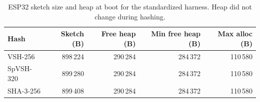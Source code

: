 \begin{table}[ht]
\caption{ESP32 sketch size and heap at boot for the standardized harness. Heap did not change during hashing.}
\label{tab:esp32-romram}
\centering
\begin{tabular}{@{}lrrrr@{}}
\toprule
Hash & Sketch (B) & Free heap (B) & Min free heap (B) & Max alloc (B) \\
\midrule
VSH-256 & 898\,224 & 290\,284 & 284\,372 & 110\,580 \\
SpVSH-320 & 899\,280 & 290\,284 & 284\,372 & 110\,580 \\
SHA-3-256 & 899\,408 & 290\,284 & 284\,372 & 110\,580 \\
\bottomrule
\end{tabular}
\end{table}
